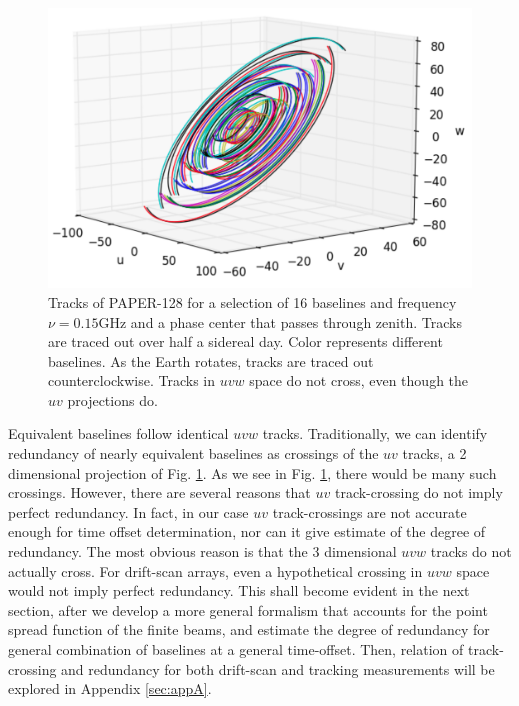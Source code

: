 \documentclass[twocolumn,apj,numberedappendix]{emulateapj}
\renewcommand\[{\begin{equation}}
\renewcommand\]{\end{equation}}
\begin{document}
\begin{figure}[H]
\includegraphics[width=\linewidth]{rotation}
\caption{Tracks of PAPER-128 for a selection of 16 baselines and frequency $\nu=0.15\text{GHz}$ and a phase center that passes through zenith.
Tracks are traced out over half a sidereal day. Color represents different baselines. 
As the Earth rotates, tracks are traced out counterclockwise. Tracks in $uvw$ space do not cross, even though the $uv$ projections do. }
\label{fig:Tracks}
\end{figure}

Equivalent baselines follow identical $uvw$ tracks. Traditionally, we can identify
redundancy of nearly equivalent baselines as crossings
of the $uv$ tracks, a 2 dimensional projection of Fig. \ref{fig:Tracks}. As we see in Fig. \ref{fig:Tracks}, there would be many such crossings. However, there are several reasons that $uv$ track-crossing do not imply perfect redundancy. In fact, in our case $uv$ track-crossings are
not accurate enough for time offset determination, nor can it give estimate of the degree of redundancy.  The most obvious reason is that the 3 dimensional $uvw$ tracks do not actually cross. For drift-scan arrays, even a hypothetical crossing in $uvw$ space would not imply perfect redundancy. This shall become evident in the next section, after we develop a more general formalism that accounts for the point spread function of the finite beams, and estimate the degree of redundancy for general combination of baselines at a general time-offset. Then, relation of track-crossing and redundancy for both drift-scan and tracking measurements will be explored in Appendix \ref{sec:appA}. 
\end{document}
